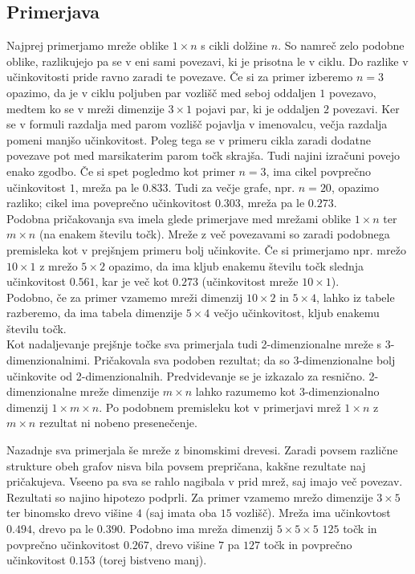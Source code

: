 \documentclass[a4paper, 16pt]{article}
\begin{document}
    \subsection{Primerjava}
    Najprej primerjamo mreže oblike $1\times n$ s cikli dolžine $n$. So namreč zelo podobne oblike, 
    razlikujejo pa se v eni sami povezavi, ki je prisotna le v ciklu. Do razlike v učinkovitosti pride
    ravno zaradi te povezave. Če si za primer izberemo $n = 3$ opazimo, da je v ciklu poljuben par vozlišč
    med seboj oddaljen $1$ povezavo, medtem ko se v mreži dimenzije $3\times 1$ pojavi par, ki je oddaljen $2$ povezavi.
    Ker se v formuli razdalja med parom vozlišč pojavlja v imenovalcu, večja razdalja pomeni manjšo učinkovitost.
    Poleg tega se v primeru cikla zaradi dodatne povezave pot med marsikaterim parom točk skrajša. Tudi najini izračuni 
    povejo enako zgodbo. Če si spet pogledmo kot primer $n = 3$, ima cikel povprečno učinkovitost $1$, mreža
    pa le $0.833$. Tudi za večje grafe, npr. $n = 20$, opazimo razliko; cikel ima poveprečno učinkovitost $0.303$, 
    mreža pa le $0.273$.\\

    Podobna pričakovanja sva imela glede primerjave med mrežami oblike $1 \times n$ ter $m \times n$ (na enakem številu točk).
    Mreže z več povezavami so zaradi podobnega premisleka kot v prejšnjem primeru bolj učinkovite. 
    Če si primerjamo npr. mrežo $10 \times 1$ z mrežo $5 \times 2$ opazimo, da ima kljub enakemu številu točk slednja učinkovitost
    $0.561$, kar je več kot $0.273$ (učinkovitost mreže $10 \times 1$).\\

    Podobno, če za primer vzamemo mreži dimenzij $10 \times 2$ in $5 \times 4$, lahko iz tabele razberemo, da ima tabela dimenzije
    $5 \times 4$ večjo učinkovitost, kljub enakemu številu točk. \\

    Kot nadaljevanje prejšnje točke sva primerjala tudi 2-dimenzionalne mreže s 3-dimenzionalnimi. Pričakovala sva
    podoben rezultat; da so 3-dimenzionalne bolj učinkovite od 2-dimenzionalnih. Predvidevanje se je izkazalo za resnično.
    2-dimenzionalne mreže dimenzije $m \times n$ lahko razumemo kot 3-dimenzionalno dimenzij $1 \times m \times n$. Po podobnem 
    premisleku kot v primerjavi mrež $1 \times n$ z $m \times n$ rezultat ni nobeno presenečenje.

    Nazadnje sva primerjala še mreže z binomskimi drevesi. Zaradi povsem različne strukture obeh grafov nisva bila povsem prepričana,
    kakšne rezultate naj pričakujeva. Vseeno pa sva se rahlo nagibala v prid mrež, saj imajo več povezav. Rezultati so najino hipotezo
    podprli. Za primer vzamemo mrežo dimenzije $3 \times 5$ ter binomsko drevo višine $4$ (saj imata oba $15$ vozlišč). Mreža ima 
    učinkovtost $0.494$, drevo pa le $0.390$. Podobno ima mreža dimenzij $5 \times 5 \times 5$ $125$ točk in povprečno učinkovitost $0.267$,
    drevo višine $7$ pa $127$ točk in povprečno učinkovitost $0.153$ (torej bistveno manj).\\
\end{document}
